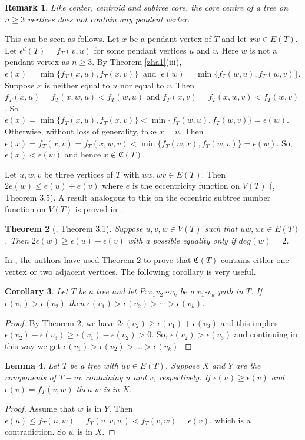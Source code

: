\documentclass[11pt]{article}
\newtheorem{theorem}{Theorem}[section]
\newtheorem{corollary}[theorem]{Corollary}
\newtheorem{lemma}[theorem]{Lemma}
\newtheorem{remark}[theorem]{Remark}
\begin{document}
\begin{remark}\label{reccentric}
Like center, centroid and subtree core, the core centre of a tree on $n\geq 3$ vertices does not contain any pendent vertex.
\end{remark}
This can be seen as follows. Let $x$ be a pendant vertex of $T$ and let $xw \in E(T)$. Let $\epsilon^d(T)=f_T(v,u)$ for some pendant vertices $u$ and $v$. Here $w$ is not a pendant vertex as $n\geq 3$. By Theorem \ref{zha1}(iii), $\epsilon(x)=\min\{f_T(x,u),f_T(x,v)\}\;\; \mbox{and}\;\; \epsilon(w)=\min\{f_T(w,u), f_T(w,v)\}$.  Suppose $x$ is neither equal to $u$ nor equal to $v$. Then $f_T(x,u)=f_T(x,w,u)<f_T(w,u)$ and $f_T(x,v)=f_T(x,w,v)<f_T(w,v)$. So $\epsilon(x)=\min\{f_T(x,u), f_T(x,v)\}<\min\{f_T(w,u), f_T(w,v)\}=\epsilon(w)$. Otherwise, without loss of generality, take $x=u$. Then $\epsilon(x)=f_T(x,v)=f_T(x,w,v)<\min\{f_T(w,x), f_T(w,v)\}=\epsilon(w)$. So, $\epsilon(x)<\epsilon(w)$ and hence $x\notin \mathfrak{C}(T)$.

Let $u,w,v$ be three vertices of $T$ with $uw,wv \in E(T)$. Then $2e(w)\leq e(u)+e(v)$ where $e$ is the eccentricity function on $V(T)$ (\cite{Pandey3}, Theorem 3.5). A result analogous to this on the eccentric subtree number function on $V(T)$ is proved in \cite{Zhang}.
\begin{theorem}[\cite{Zhang}, Theorem 3.1]\label{zha2}
Suppose $u,v,w\in V(T)$ such that $uw,wv \in E(T)$. Then $2\epsilon(w)\geq \epsilon(u)+\epsilon(v)$ with a possible equality only if $deg(w)=2$. 
\end{theorem}
In \cite{Zhang}, the authors have used Theorem \ref{zha2} to prove that $\mathfrak{C}(T)$ contains either one vertex or two adjacent vertices. The following corollary is very useful.
\begin{corollary}\label{cor1}
Let $T$ be a tree and let $P:v_1v_2\cdots v_k$ be a $v_1$-$v_k$ path in $T$. If $\epsilon(v_1)>\epsilon(v_2)$  then $\epsilon(v_1)>\epsilon(v_2)>\cdots>\epsilon(v_k)$. 
\end{corollary}
\begin{proof} By Theorem \ref{zha2}, we have $2\epsilon(v_2)\geq\epsilon(v_1)+\epsilon(v_3)$ and this implies $\epsilon(v_2)-\epsilon(v_3)\geq \epsilon(v_1)-\epsilon(v_2)>0$. So, $\epsilon(v_2)>\epsilon(v_3)$ and continuing in this way we get  $\epsilon(v_1)>\epsilon(v_2)>\ldots>\epsilon(v_k)$.  
\end{proof}


\begin{lemma}\label{lem2}
Let $T$ be a tree with $uv\in E(T)$. Suppose $X$ and $Y$ are the components of ${T}-uv$ containing $u$ and $v$, respectively. If $\epsilon(u)\geq \epsilon(v)$ and $\epsilon(v)=f_T(v,w)$ then $w$ is in $X$.    
\end{lemma}
\begin{proof} Assume that  $w$ is in $Y$. Then ${\epsilon}(u)\leq f_T(u,w)=f_T(u,v,w)<f_T(v,w)={\epsilon}(v)$, which is a contradiction. So $w$ is in $X$.  
\end{proof}
\end{document}
